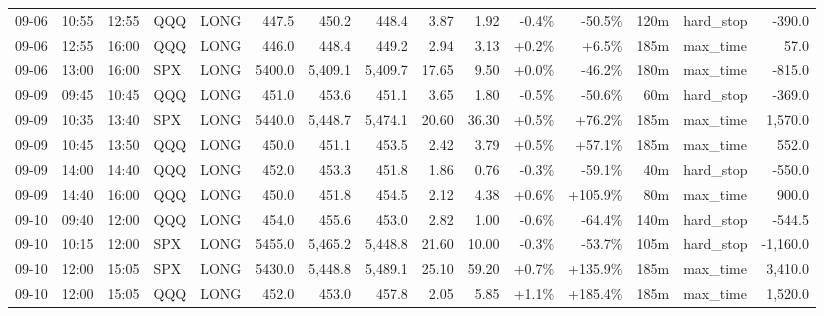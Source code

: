 \documentclass[11pt,a4paper,twoside]{article}
\begin{document}
\begin{landscape}
\begin{center}
\begin{longtable}{>{\color{txtmain}}l l l l l r r r r r r r r >{\color{txtmain}}l r}
09-06 & 10:55 & 12:55 & QQQ & LONG & 447.5 & 450.2 & 448.4 & 3.87 & 1.92 & \textcolor{lossred}{-0.4\%} & \textcolor{lossred}{-50.5\%} & 120m & hard\_stop & \textcolor{lossred}{-390.0} \\
09-06 & 12:55 & 16:00 & QQQ & LONG & 446.0 & 448.4 & 449.2 & 2.94 & 3.13 & \textcolor{wingreen}{+0.2\%} & \textcolor{wingreen}{+6.5\%} & 185m & max\_time & \textcolor{wingreen}{57.0} \\
09-06 & 13:00 & 16:00 & SPX & LONG & 5400.0 & 5,409.1 & 5,409.7 & 17.65 & 9.50 & \textcolor{wingreen}{+0.0\%} & \textcolor{lossred}{-46.2\%} & 180m & max\_time & \textcolor{lossred}{-815.0} \\
09-09 & 09:45 & 10:45 & QQQ & LONG & 451.0 & 453.6 & 451.1 & 3.65 & 1.80 & \textcolor{lossred}{-0.5\%} & \textcolor{lossred}{-50.6\%} & 60m & hard\_stop & \textcolor{lossred}{-369.0} \\
09-09 & 10:35 & 13:40 & SPX & LONG & 5440.0 & 5,448.7 & 5,474.1 & 20.60 & 36.30 & \textcolor{wingreen}{+0.5\%} & \textcolor{wingreen}{+76.2\%} & 185m & max\_time & \textcolor{wingreen}{1,570.0} \\
09-09 & 10:45 & 13:50 & QQQ & LONG & 450.0 & 451.1 & 453.5 & 2.42 & 3.79 & \textcolor{wingreen}{+0.5\%} & \textcolor{wingreen}{+57.1\%} & 185m & max\_time & \textcolor{wingreen}{552.0} \\
09-09 & 14:00 & 14:40 & QQQ & LONG & 452.0 & 453.3 & 451.8 & 1.86 & 0.76 & \textcolor{lossred}{-0.3\%} & \textcolor{lossred}{-59.1\%} & 40m & hard\_stop & \textcolor{lossred}{-550.0} \\
09-09 & 14:40 & 16:00 & QQQ & LONG & 450.0 & 451.8 & 454.5 & 2.12 & 4.38 & \textcolor{wingreen}{+0.6\%} & \textcolor{wingreen}{+105.9\%} & 80m & max\_time & \textcolor{wingreen}{900.0} \\
09-10 & 09:40 & 12:00 & QQQ & LONG & 454.0 & 455.6 & 453.0 & 2.82 & 1.00 & \textcolor{lossred}{-0.6\%} & \textcolor{lossred}{-64.4\%} & 140m & hard\_stop & \textcolor{lossred}{-544.5} \\
09-10 & 10:15 & 12:00 & SPX & LONG & 5455.0 & 5,465.2 & 5,448.8 & 21.60 & 10.00 & \textcolor{lossred}{-0.3\%} & \textcolor{lossred}{-53.7\%} & 105m & hard\_stop & \textcolor{lossred}{-1,160.0} \\
09-10 & 12:00 & 15:05 & SPX & LONG & 5430.0 & 5,448.8 & 5,489.1 & 25.10 & 59.20 & \textcolor{wingreen}{+0.7\%} & \textcolor{wingreen}{+135.9\%} & 185m & max\_time & \textcolor{wingreen}{3,410.0} \\
09-10 & 12:00 & 15:05 & QQQ & LONG & 452.0 & 453.0 & 457.8 & 2.05 & 5.85 & \textcolor{wingreen}{+1.1\%} & \textcolor{wingreen}{+185.4\%} & 185m & max\_time & \textcolor{wingreen}{1,520.0} \\

\end{longtable}
\end{center}
\end{landscape}
\end{document}
